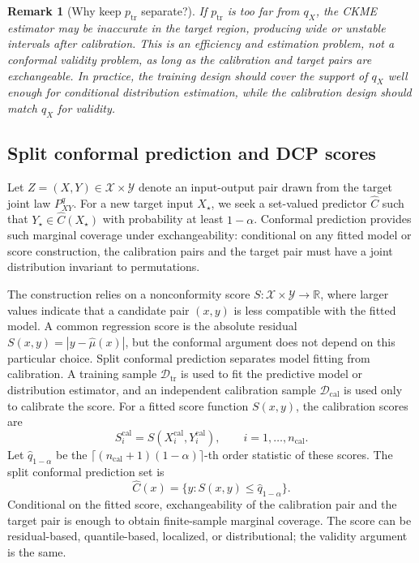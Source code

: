 \documentclass[11pt]{article}
\newtheorem{remark}{Remark}
\newcommand{\Xcal}{\mathcal X}
\newcommand{\Ycal}{\mathcal Y}
\newcommand{\Dcal}{\mathcal D}
\newcommand{\R}{\mathbb R}
\begin{document}
\begin{remark}[Why keep \(p_{\mathrm{tr}}\) separate?]
If \(p_{\mathrm{tr}}\) is too far from \(q_X\), the CKME estimator may be inaccurate in the target region, producing wide or unstable intervals after calibration. This is an efficiency and estimation problem, not a conformal validity problem, as long as the calibration and target pairs are exchangeable. In practice, the training design should cover the support of \(q_X\) well enough for conditional distribution estimation, while the calibration design should match \(q_X\) for validity.
\end{remark}

\subsection{Split conformal prediction and DCP scores}

Let \(Z=(X,Y)\in\Xcal\times\Ycal\) denote an input-output pair drawn from the target joint law \(P^q_{XY}\). For a new target input \(X_\star\), we seek a set-valued predictor \(\widehat C\) such that \(Y_\star\in\widehat C(X_\star)\) with probability at least \(1-\alpha\). Conformal prediction provides such marginal coverage under exchangeability: conditional on any fitted model or score construction, the calibration pairs and the target pair must have a joint distribution invariant to permutations.

The construction relies on a nonconformity score \(S:\Xcal\times\Ycal\to\R\), where larger values indicate that a candidate pair \((x,y)\) is less compatible with the fitted model. A common regression score is the absolute residual \(S(x,y)=|y-\widehat\mu(x)|\), but the conformal argument does not depend on this particular choice. Split conformal prediction separates model fitting from calibration. A training sample \(\Dcal_{\mathrm{tr}}\) is used to fit the predictive model or distribution estimator, and an independent calibration sample \(\Dcal_{\mathrm{cal}}\) is used only to calibrate the score. For a fitted score function \(S(x,y)\), the calibration scores are
\[
  S_i^{\mathrm{cal}}=S(X_i^{\mathrm{cal}},Y_i^{\mathrm{cal}}),
  \qquad i=1,\ldots,n_{\mathrm{cal}}.
\]
Let \(\widehat q_{1-\alpha}\) be the \(\lceil(n_{\mathrm{cal}}+1)(1-\alpha)\rceil\)-th order statistic of these scores. The split conformal prediction set is
\[
  \widehat C(x)=\{y:S(x,y)\le \widehat q_{1-\alpha}\}.
\]
Conditional on the fitted score, exchangeability of the calibration pair and the target pair is enough to obtain finite-sample marginal coverage. The score can be residual-based, quantile-based, localized, or distributional; the validity argument is the same.
\end{document}
